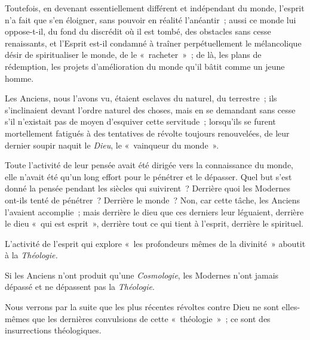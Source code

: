 \documentclass[french,twoside]{book} %
\begin{document}
Toutefois, en devenant essentiellement différent et indépendant du monde, l’esprit n’a fait que s’en  éloigner, sans pouvoir en réalité l’anéantir ; aussi ce monde lui oppose-t-il, du fond du discrédit où il est tombé, des obstacles sans cesse renaissants, et l’Esprit est-il condamné à traîner perpétuellement le mélancolique désir de spiritualiser le monde, de le « racheter » ; de là, les plans de rédemption, les projets d’amélioration du monde qu’il bâtit comme un jeune homme.\par
Les Anciens, nous l’avons vu, étaient esclaves du naturel, du terrestre ; ils s’inclinaient devant l’ordre naturel des choses, mais en se demandant sans cesse s’il n’existait pas de moyen d’esquiver cette servitude ; lorsqu’ils se furent mortellement fatigués à des tentatives de révolte toujours renouvelées, de leur dernier soupir naquit le \emph{Dieu}, le « vainqueur du monde ».\par
Toute l’activité de leur pensée avait été dirigée vers la connaissance du monde, elle n’avait été qu’un long effort pour le pénétrer et le dépasser. Quel but s’est donné la pensée pendant les siècles qui suivirent ? Derrière quoi les Modernes ont-ils tenté de pénétrer ? Derrière le monde ? Non, car cette tâche, les Anciens l’avaient accomplie ; mais derrière le dieu que ces derniers leur léguaient, derrière le dieu « qui est esprit », derrière tout ce qui tient à l’esprit, derrière le spirituel.\par
L’activité de l’esprit qui explore « les profondeurs mêmes de la divinité » aboutit à la \emph{Théologie.}\par
Si les Anciens n’ont produit qu’une \emph{Cosmologie}, les Modernes n’ont jamais dépassé et ne dépassent pas la \emph{Théologie}.\par
Nous verrons par la suite que les plus récentes révoltes contre Dieu ne sont elles-mêmes que les dernières convulsions de cette « théologie » ; ce sont des insurrections théologiques.\par
\end{document}
